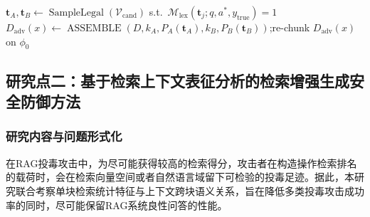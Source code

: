 \begin{algorithm}[H]
  $\mathbf t_A,\mathbf t_B\leftarrow\operatorname{SampleLegal}(\mathcal V_{\mathrm{cand}})$ s.t.\ $\mathcal M_{\mathrm{lex}}(\mathbf t_j;q,a^*,y_{\mathrm{true}})=1$\;
  $D_{\mathrm{adv}}(x)\leftarrow\operatorname{ASSEMBLE}(D, k_A, P_A(\mathbf t_A), k_B, P_B(\mathbf t_B))$;\quad re-chunk $D_{\mathrm{adv}}(x)$ on $\phi_0$\;
\end{algorithm}

\subsection{研究点二：基于检索上下文表征分析的检索增强生成安全防御方法}

\subsubsection{研究内容与问题形式化}

在RAG投毒攻击中，为尽可能获得较高的检索得分，攻击者在构造操作检索排名的载荷时，会在检索向量空间或者自然语言域留下可检验的投毒足迹。据此，本研究联合考察单块检索统计特征与上下文跨块语义关系，旨在降低多类投毒攻击成功率的同时，尽可能保留RAG系统良性问答的性能。

